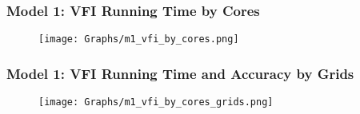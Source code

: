 \documentclass[xcolor=x11names,compress]{beamer}
\renewcommand{\(}{\begin{columns}}
\renewcommand{\)}{\end{columns}}
\newcommand{\<}[1]{\begin{column}{#1}}
\renewcommand{\>}{\end{column}}
\begin{document}
\setcounter{subfigure}{0}
\begin{frame}
\frametitle{Model 1: VFI Running Time by Cores}
\begin{figure}
\begin{center}
\texttt{[image: Graphs/m1\_vfi\_by\_cores.png]}
\end{center}
\end{figure}
\end{frame}



\setcounter{subfigure}{0}
\begin{frame}
\frametitle{Model 1: VFI Running Time and Accuracy by Grids}
\begin{figure}
\begin{center}
\texttt{[image: Graphs/m1\_vfi\_by\_cores\_grids.png]}
\end{center}
\end{figure}
\end{frame}
\end{document}
